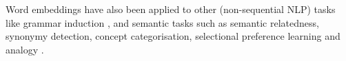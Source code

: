 Word embeddings have also been applied to other (non-sequential NLP)
tasks like grammar induction \cite{Spitkovsky:2011}, and semantic tasks
such as semantic relatedness, synonymy detection, concept
categorisation, selectional preference learning and analogy \cite{baroni:2014}.






